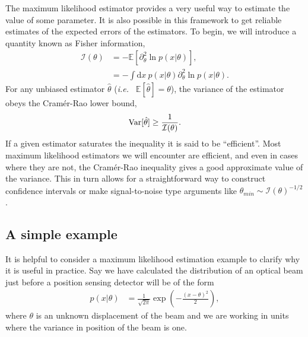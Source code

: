 The maximum likelihood estimator provides a very useful way to estimate the value of some parameter.  It is also possible in this framework to get reliable estimates of the expected errors of the estimators.  To begin, we will introduce a quantity known as Fisher information,
\begin{align}
\nonumber  \mathcal{I}(\theta) &= -\mathbb{E}\left[\partial^2_\theta \ln p(x|\theta)\right], \\
                               &= -\int \text{d}x~ p(x|\theta)\partial^2_\theta \ln p(x|\theta).
\end{align}
For any unbiased estimator $\hat{\theta}$ (\emph{i.e.~} $\mathbb{E}[\hat{\theta}] = \theta$), the variance of the estimator obeys the Cram\'{e}r-Rao lower bound,
\begin{align}
  {\rm {Var}}[\hat{\theta}] \ge \frac{1}{\mathcal{I}(\theta)}.
\end{align}
If a given estimator saturates the inequality it is said to be ``efficient''.  Most maximum likelihood estimators we will encounter are efficient, and even in cases where they are not, the Cram\'{e}r-Rao inequality gives a good approximate value of the variance.  This in turn allows for a straightforward way to construct confidence intervals or make signal-to-noise type arguments like $\theta_{min} \sim \mathcal{I}(\theta)^{-1/2}$.

\subsection{A simple example}
It is helpful to consider a maximum likelihood estimation example to clarify why it is useful in practice.  Say we have calculated the distribution of an optical beam just before a position sensing detector will be of the form
\begin{align}
  p(x|\theta) &= \frac{1}{\sqrt{2\pi}}\exp\left(-\frac{(x-\theta)^2}{2} \right),
\end{align}
where $\theta$ is an unknown displacement of the beam and we are working in units where the variance in position of the beam is one.

